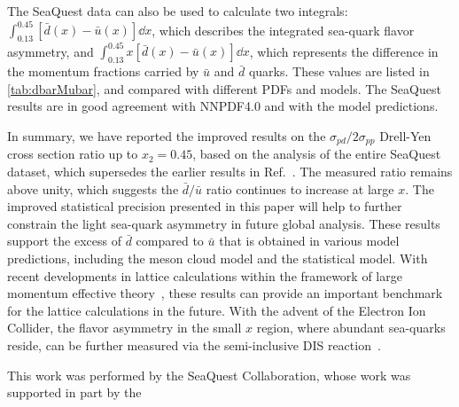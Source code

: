 \documentclass[reprint,aps,unsortedaddress,superscriptaddress,prl,floatfix,showpacs,linenumbers]{revtex4-2}
\begin{document}
The SeaQuest data can also be used to calculate two integrals: 
$\int^{0.45}_{0.13} \left[\bar{d}\left(x\right) - \bar{u}\left(x\right) \right]\dd{x}$,
which describes the integrated sea-quark flavor asymmetry, and 
$\int^{0.45}_{0.13} x\left[\bar{d}\left(x\right) - \bar{u}\left(x\right) \right]\dd{x}$,
which represents the difference in the momentum fractions carried 
by $\bar{u}$ and $\bar{d}$ quarks.
These values are listed in \cref{tab:dbarMubar}, and compared with different PDFs and models.
The SeaQuest results are in good agreement with NNPDF4.0 and with the model predictions.

In summary, we have reported the improved results on the 
$\sigma_{pd}/2\sigma_{pp}$ Drell-Yen cross section ratio up to $x_2=0.45$,
based on the analysis of the entire SeaQuest dataset,
which supersedes the earlier results in Ref.~\cite{dove2021,dove2023}.
The measured ratio remains above unity, 
which suggests the $\bar{d}/\bar{u}$ ratio continues to increase at large $x$.
The improved statistical precision presented in this paper will help to 
further constrain the light sea-quark asymmetry in future global analysis.
These results support the excess of $\bar{d}$ compared to $\bar{u}$ that is obtained in various model predictions,
including the meson cloud model and the statistical model.
With recent developments in lattice calculations within the framework 
of large momentum effective theory~\cite{constantinou2021},
these results can provide an important benchmark for the lattice 
calculations in the future.
With the advent of the Electron Ion Collider, the flavor asymmetry in the small $x$ region,
where abundant sea-quarks reside, can be further measured via the semi-inclusive DIS reaction~\cite{ackerstaff1998}.

\begin{acknowledgments}
	This work was performed by the SeaQuest Collaboration, whose work was supported in part by the
\end{acknowledgments}

\end{document}
